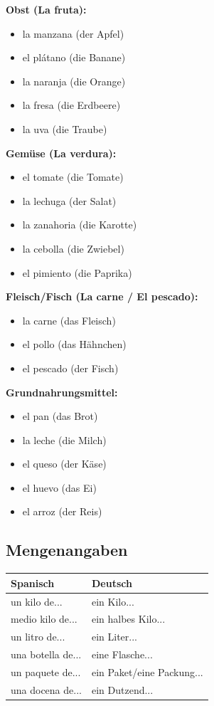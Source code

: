 \documentclass[11pt,a4paper]{article}
\begin{document}
\textbf{Obst (La fruta):}
\begin{itemize}
    \item la manzana (der Apfel)
    \item el plátano (die Banane)
    \item la naranja (die Orange)
    \item la fresa (die Erdbeere)
    \item la uva (die Traube)
\end{itemize}

\textbf{Gemüse (La verdura):}
\begin{itemize}
    \item el tomate (die Tomate)
    \item la lechuga (der Salat)
    \item la zanahoria (die Karotte)
    \item la cebolla (die Zwiebel)
    \item el pimiento (die Paprika)
\end{itemize}

\textbf{Fleisch/Fisch (La carne / El pescado):}
\begin{itemize}
    \item la carne (das Fleisch)
    \item el pollo (das Hähnchen)
    \item el pescado (der Fisch)
\end{itemize}

\textbf{Grundnahrungsmittel:}
\begin{itemize}
    \item el pan (das Brot)
    \item la leche (die Milch)
    \item el queso (der Käse)
    \item el huevo (das Ei)
    \item el arroz (der Reis)
\end{itemize}

\subsection{Mengenangaben}

\begin{center}
\begin{tabular}{|l|l|}
\hline
\textbf{Spanisch} & \textbf{Deutsch} \\
\hline
un kilo de... & ein Kilo... \\
medio kilo de... & ein halbes Kilo... \\
un litro de... & ein Liter... \\
una botella de... & eine Flasche... \\
un paquete de... & ein Paket/eine Packung... \\
una docena de... & ein Dutzend... \\
\hline
\end{tabular}
\end{center}
\end{document}

